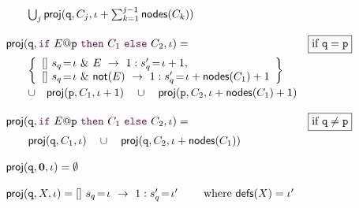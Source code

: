 \begin{definition}
\begin{displaymath}
\begin{array}{lr}
          \qquad\bigcup_{j} \proj (\role q, C_j, \iota+\sum_{k=1}^{j-1}\mathsf{nodes}({C_k}))

          \\\\

          \proj (\role q,\ifTE {E}{p}{C_1}{C_2}, \iota) = 
          &  \boxed{\text{if }\role q=\role p}\\[2mm]
          \qquad\left\{ 
          \begin{array}{lll}
            \commandBase {} {s_{q}\!=\! \iota\ \&\ E}{\ 1: s'_{q}\!=\! \iota+1},\\ 
            \commandBase {} {s_{q}\!=\! \iota\ \&\ \mathsf{not}(E)}
            {\ 1: s'_{q}\!=\! \iota+\mathsf{nodes}(C_1)+1}
          \end{array}
          \right\}
          \\[3mm]
          \qquad\cup\quad \proj (\role{p}, C_1, \iota+1)
          \quad\cup\quad
          \proj (\role{p}, C_2, \iota+\mathsf{nodes}(C_1)+1)
          \\\\

          \proj (\role q,\ifTE {E}{p}{C_1}{C_2}, \iota) = 
          &  \boxed{\text{if }\role q\neq\role p}\\[2mm]


          \qquad \proj (\role{q}, C_1, \iota)
          \quad\cup\quad
          \proj (\role{q}, C_2, \iota+\mathsf{nodes}(C_1))



          \\\\

          \proj (\role q,\CEnd, \iota) = \emptyset

          \\\\

          \proj (\role q, X, \iota) = 
          \commandBase {} {s_{q}\!=\! \iota}{\ 1: s'_{q}\!=\! \iota'}
          \qquad\text{ where } \textsf{defs}(X) = \iota'

        \end{array}
      \end{displaymath}
    \end{definition}

